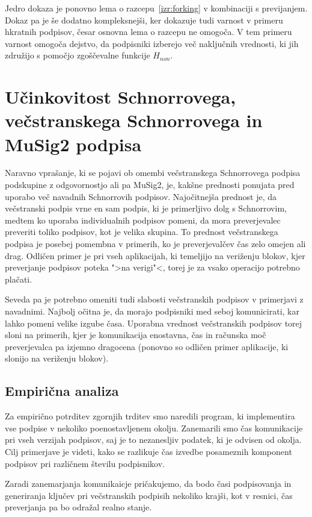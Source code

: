 \documentclass[isrm2, tisk]{fmfdelo}
\begin{document}
Jedro dokaza je ponovno lema o razcepu~\ref{izr:forking} v kombinaciji s previjanjem. Dokaz pa je še
dodatno kompleksnejši, ker dokazuje tudi varnost v primeru hkratnih podpisov, česar osnovna lema
o razcepu ne omogoča. V tem primeru varnost omogoča dejstvo, da podpisniki izberejo več naključnih
vrednosti, ki jih združijo s pomočjo zgoščevalne funkcije $H_{non}$.

\section{Učinkovitost Schnorrovega, večstranskega Schnorrovega in MuSig2 podpisa}
\label{sec:primerjava}
Naravno vprašanje, ki se pojavi ob omembi večstranskega Schnorrovega podpisa podskupine z odgovornostjo
ali pa MuSig2, je, kakšne prednosti ponujata pred uporabo več navadnih Schnorrovih podpisov. Najočitnejša
prednost je, da večstranski podpis vrne en sam podpis, ki je primerljivo dolg s Schnorrovim, medtem
ko uporaba individualnih podpisov pomeni, da mora preverjevalec preveriti toliko podpisov, kot je
velika skupina. To prednost večstranskega podpisa je posebej pomembna v primerih, ko je preverjevalčev
čas zelo omejen ali drag. Odličen primer je pri vseh aplikacijah, ki temeljijo na veriženju blokov,
kjer preverjanje podpisov poteka ">na verigi"<, torej je za vsako operacijo potrebno plačati.

Seveda pa je potrebno omeniti tudi slabosti večstranskih podpisov v primerjavi z navadnimi. Najbolj
očitna je, da morajo podpisniki med seboj komunicirati, kar lahko pomeni velike izgube časa. Uporabna
vrednost večstranskih podpisov torej sloni na primerih, kjer je komunikacija enostavna, čas in
računska moč preverjevalca pa izjemno dragocena (ponovno so odličen primer aplikacije, ki slonijo
na veriženju blokov).

\subsection{Empirična analiza}
Za empirično potrditev zgornjih trditev smo naredili program, ki implementira vse podpise v nekoliko
poenostavljenem okolju. Zanemarili smo čas komunikacije pri vseh verzijah podpisov, saj je to nezanesljiv
podatek, ki je odvisen od okolja. Cilj primerjave je videti, kako se razlikuje čas izvedbe posameznih
komponent podpisov pri različnem številu podpisnikov.

Zaradi zanemarjanja komunikaicje pričakujemo, da bodo časi podpisovanja in generiranja ključev pri
večstranskih podpisih nekoliko krajši, kot v resnici, čas preverjanja pa bo odražal realno stanje.
\end{document}
